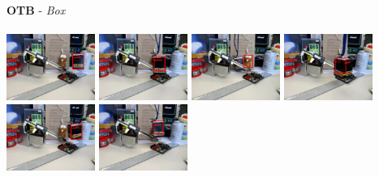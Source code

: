 \documentclass[10pt,twocolumn,letterpaper,french]{article}
\begin{document}
\begin{appendices}
\begin{center}
  \textbf{OTB} - \textit{Box}\\
  \hspace{1cm}\\
  \includegraphics[width=82pt, cfbox=green 1pt 1pt]{images/exemples/bof/box/000001.png}
  \includegraphics[width=82pt, cfbox=green 1pt 1pt]{images/exemples/bof/box/000119.png}
  \includegraphics[width=82pt, cfbox=red 1pt 1pt]{images/exemples/bof/box/000311.png}
  \includegraphics[width=82pt, cfbox=green 1pt 1pt]{images/exemples/bof/box/000567.png}
  \includegraphics[width=82pt, cfbox=green 1pt 1pt]{images/exemples/bof/box/000839.png}
  \includegraphics[width=82pt, cfbox=green 1pt 1pt]{images/exemples/bof/box/001127.png}\\
  \hspace{1cm}\\
  \hspace{1cm}\\


\end{center}
\end{appendices}
\end{document}
